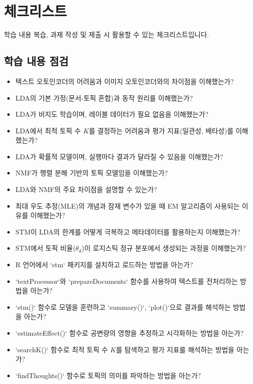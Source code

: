 \documentclass[11pt,a4paper]{article}
\begin{document}
\newpage
\section*{체크리스트}
학습 내용 복습, 과제 작성 및 제출 시 활용할 수 있는 체크리스트입니다.

\subsection*{학습 내용 점검}
\begin{itemize}
    \item 텍스트 오토인코더의 어려움과 이미지 오토인코더와의 차이점을 이해했는가?
    \item LDA의 기본 가정(문서-토픽 혼합)과 동작 원리를 이해했는가?
    \item LDA가 비지도 학습이며, 레이블 데이터가 필요 없음을 이해했는가?
    \item LDA에서 최적 토픽 수 $K$를 결정하는 어려움과 평가 지표(일관성, 배타성)를 이해했는가?
    \item LDA가 확률적 모델이며, 실행마다 결과가 달라질 수 있음을 이해했는가?
    \item NMF가 행렬 분해 기반의 토픽 모델임을 이해했는가?
    \item LDA와 NMF의 주요 차이점을 설명할 수 있는가?
    \item 최대 우도 추정(MLE)의 개념과 잠재 변수가 있을 때 EM 알고리즘이 사용되는 이유를 이해했는가?
    \item STM이 LDA의 한계를 어떻게 극복하고 메타데이터를 활용하는지 이해했는가?
    \item STM에서 토픽 비율($\theta_d$)이 로지스틱 정규 분포에서 생성되는 과정을 이해했는가?
    \item R 언어에서 `stm` 패키지를 설치하고 로드하는 방법을 아는가?
    \item `textProcessor`와 `prepareDocuments` 함수를 사용하여 텍스트를 전처리하는 방법을 아는가?
    \item `stm()` 함수로 모델을 훈련하고 `summary()`, `plot()`으로 결과를 해석하는 방법을 아는가?
    \item `estimateEffect()` 함수로 공변량의 영향을 추정하고 시각화하는 방법을 아는가?
    \item `searchK()` 함수로 최적 토픽 수 $K$를 탐색하고 평가 지표를 해석하는 방법을 아는가?
    \item `findThoughts()` 함수로 토픽의 의미를 파악하는 방법을 아는가?
\end{itemize}
\end{document}
